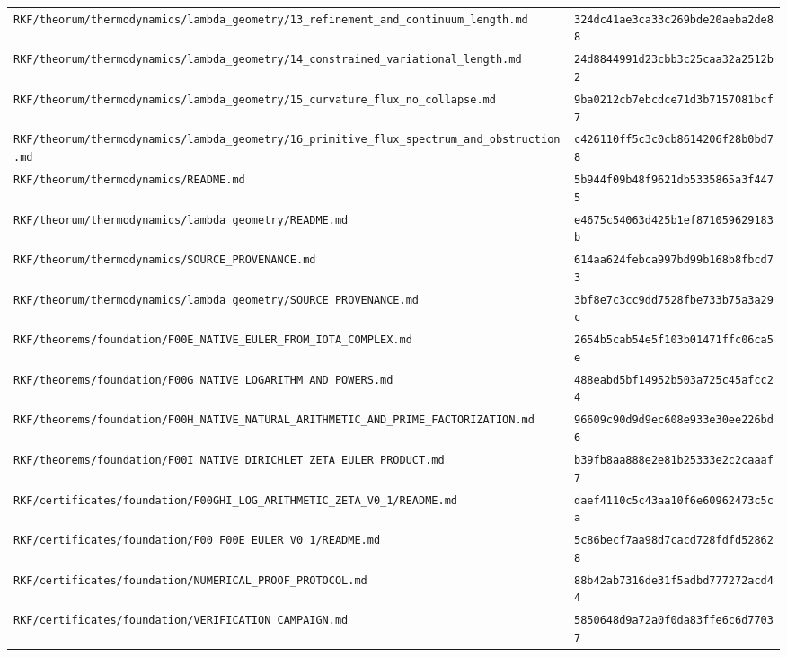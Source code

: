\documentclass[11pt,openany]{book}
\begin{document}
\begin{small}
\begin{longtable}{p{}p{}}
\texttt{RKF/theorum/thermodynamics/lambda\_geometry/13\_refinement\_and\_continuum\_length.md} & \texttt{324dc41ae3ca33c269bde20aeba2de88}\\
\texttt{RKF/theorum/thermodynamics/lambda\_geometry/14\_constrained\_variational\_length.md} & \texttt{24d8844991d23cbb3c25caa32a2512b2}\\
\texttt{RKF/theorum/thermodynamics/lambda\_geometry/15\_curvature\_flux\_no\_collapse.md} & \texttt{9ba0212cb7ebcdce71d3b7157081bcf7}\\
\texttt{RKF/theorum/thermodynamics/lambda\_geometry/16\_primitive\_flux\_spectrum\_and\_obstruction.md} & \texttt{c426110ff5c3c0cb8614206f28b0bd78}\\
\texttt{RKF/theorum/thermodynamics/README.md} & \texttt{5b944f09b48f9621db5335865a3f4475}\\
\texttt{RKF/theorum/thermodynamics/lambda\_geometry/README.md} & \texttt{e4675c54063d425b1ef871059629183b}\\
\texttt{RKF/theorum/thermodynamics/SOURCE\_PROVENANCE.md} & \texttt{614aa624febca997bd99b168b8fbcd73}\\
\texttt{RKF/theorum/thermodynamics/lambda\_geometry/SOURCE\_PROVENANCE.md} & \texttt{3bf8e7c3cc9dd7528fbe733b75a3a29c}\\
\texttt{RKF/theorems/foundation/F00E\_NATIVE\_EULER\_FROM\_IOTA\_COMPLEX.md} & \texttt{2654b5cab54e5f103b01471ffc06ca5e}\\
\texttt{RKF/theorems/foundation/F00G\_NATIVE\_LOGARITHM\_AND\_POWERS.md} & \texttt{488eabd5bf14952b503a725c45afcc24}\\
\texttt{RKF/theorems/foundation/F00H\_NATIVE\_NATURAL\_ARITHMETIC\_AND\_PRIME\_FACTORIZATION.md} & \texttt{96609c90d9d9ec608e933e30ee226bd6}\\
\texttt{RKF/theorems/foundation/F00I\_NATIVE\_DIRICHLET\_ZETA\_EULER\_PRODUCT.md} & \texttt{b39fb8aa888e2e81b25333e2c2caaaf7}\\
\texttt{RKF/certificates/foundation/F00GHI\_LOG\_ARITHMETIC\_ZETA\_V0\_1/README.md} & \texttt{daef4110c5c43aa10f6e60962473c5ca}\\
\texttt{RKF/certificates/foundation/F00\_F00E\_EULER\_V0\_1/README.md} & \texttt{5c86becf7aa98d7cacd728fdfd528628}\\
\texttt{RKF/certificates/foundation/NUMERICAL\_PROOF\_PROTOCOL.md} & \texttt{88b42ab7316de31f5adbd777272acd44}\\
\texttt{RKF/certificates/foundation/VERIFICATION\_CAMPAIGN.md} & \texttt{5850648d9a72a0f0da83ffe6c6d77037}\\

\end{longtable}
\end{small}
\end{document}
